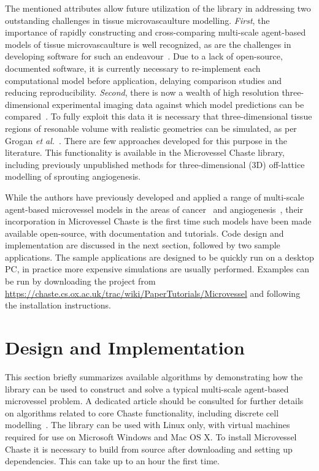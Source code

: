 \documentclass[10pt,letterpaper]{article}
\begin{document}
The mentioned attributes allow future utilization of the library in addressing two outstanding challenges in tissue microvascaulture modelling. \emph{First}, the importance of rapidly constructing and cross-comparing multi-scale agent-based models of tissue microvascaulture is well recognized, as are the challenges in developing software for such an endeavour~\cite{Rieger2015, Connor2012}. Due to a lack of open-source, documented software, it is currently necessary to re-implement each computational model before application, delaying comparison studies and reducing reproducibility. \emph{Second}, there is now a wealth of high resolution three-dimensional experimental imaging data against which model predictions can be compared~\cite{Tozer2004}. To fully exploit this data it is necessary that three-dimensional tissue regions of resonable volume with realistic geometries can be simulated, as per Grogan \emph{et al.}~\cite{Grogan2016}. There are few approaches developed for this purpose in the literature. This functionality is available in the Microvessel Chaste library, including previously unpublished methods for three-dimensional (3D) off-lattice modelling of sprouting angiogenesis.  

While the authors have previously developed and applied a range of multi-scale agent-based microvessel models in the areas of cancer~\cite{Alarcon2005, Perfahl2011, Grogan2016} and angiogenesis~\cite{Connor2015}, their incorporation in Microvessel Chaste is the first time such models have been made available open-source, with documentation and tutorials. Code design and implementation are discussed in the next section, followed by two sample applications. The sample applications are designed to be quickly run on a desktop PC, in practice more expensive simulations are usually performed. Examples can be run by downloading the project from \url{https://chaste.cs.ox.ac.uk/trac/wiki/PaperTutorials/Microvessel} and following the installation instructions. 

\section*{Design and Implementation}

This section briefly summarizes available algorithms by demonstrating how the library can be used to construct and solve a typical multi-scale agent-based microvessel problem. A dedicated article should be consulted for further details on algorithms related to core Chaste functionality, including discrete cell modelling~\cite{Mirams2013}. The library can be used with Linux only, with virtual machines required for use on Microsoft Windows and Mac OS X. To install Microvessel Chaste it is necessary to build from source after downloading and setting up dependencies. This can take up to an hour the first time.
\end{document}
